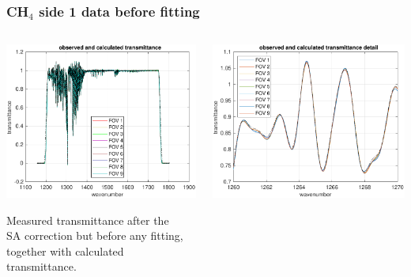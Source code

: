 \documentclass[9pt]{beamer}
\begin{document}
\begin{frame}
\frametitle{CH$_4$ side 1 data before fitting}
\begin{columns}[t]
\begin{column}{0.5\textwidth}  
  \begin{centering}
  \includegraphics[width=\textwidth]{02-11_mn_s1_CH4/spec_test2_all.pdf}
  \end{centering}\vspace{3mm}

Measured transmittance after the \\ SA correction but before any
fitting, together with calculated transmittance.

\end{column}

\begin{column}{0.5\textwidth}
  \begin{centering}
  \includegraphics[width=\textwidth]{02-11_mn_s1_CH4/spec_test2_zoom.pdf}
  \end{centering}\vspace{3mm}


\end{column}
\end{columns}
\end{frame}
\end{document}
